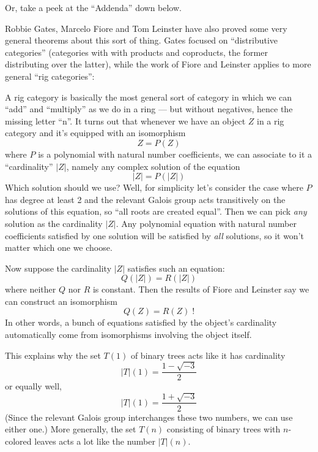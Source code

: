 \documentclass{article}
\renewcommand{\texttt}[1]{%
  \begingroup
  \ttfamily
  \begingroup\lccode`~=`/\lowercase{\endgroup\def~}{/\discretionary{}{}{}}%
  \begingroup\lccode`~=`[\lowercase{\endgroup\def~}{[\discretionary{}{}{}}%
  \begingroup\lccode`~=`.\lowercase{\endgroup\def~}{.\discretionary{}{}{}}%
  \catcode`/=\active\catcode`[=\active\catcode`.=\active
  \scantokens{#1\noexpand}%
  \endgroup
}
\begin{document}
Or, take a peek at the ``Addenda'' down below.

Robbie Gates, Marcelo Fiore and Tom Leinster have also proved some very
general theorems about this sort of thing. Gates focused on
``distributive categories'' (categories with with products and
coproducts, the former distributing over the latter), while the work of
Fiore and Leinster applies to more general ``rig categories'':


A rig category is basically the most general sort of category in which
we can ``add'' and ``multiply'' as we do in a ring --- but without
negatives, hence the missing letter ``n''. It turns out that whenever we
have an object \(Z\) in a rig category and it's equipped with an
isomorphism \[Z = P(Z)\] where \(P\) is a polynomial with natural number
coefficients, we can associate to it a ``cardinality'' \(|Z|\), namely
any complex solution of the equation \[|Z| = P(|Z|)\] Which solution
should we use? Well, for simplicity let's consider the case where \(P\)
has degree at least 2 and the relevant Galois group acts transitively on
the solutions of this equation, so ``all roots are created equal''. Then
we can pick \emph{any} solution as the cardinality \(|Z|\). Any
polynomial equation with natural number coefficients satisfied by one
solution will be satisfied by \emph{all} solutions, so it won't matter
which one we choose.

Now suppose the cardinality \(|Z|\) satisfies such an equation:
\[Q(|Z|) = R(|Z|)\] where neither \(Q\) nor \(R\) is constant. Then the
results of Fiore and Leinster say we can construct an isomorphism
\[Q(Z) = R(Z)\;\mbox{!}\] In other words, a bunch of equations satisfied
by the object's cardinality automatically come from isomorphisms
involving the object itself.

This explains why the set \(T(1)\) of binary trees acts like it has
cardinality \[|T|(1) = \frac{1-\sqrt{-3}}{2}\] or equally well,
\[|T|(1) = \frac{1+\sqrt{-3}}{2}\] (Since the relevant Galois group
interchanges these two numbers, we can use either one.) More generally,
the set \(T(n)\) consisting of binary trees with \(n\)-colored leaves
acts a lot like the number \(|T|(n)\).
\end{document}
